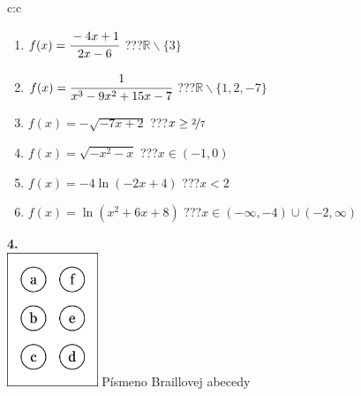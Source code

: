 \documentclass[10pt]{report}
\begin{document}
\begin{tabular}{c:c}
\begin{minipage}[c][104.5mm][t]{0.5\linewidth}
\begin{center}
\begin{minipage}{0.79\linewidth}
\begin{center}
\begin{varwidth}{\linewidth}
\begin{enumerate}
\item $f(x)=\cfrac{-4x+1}{2x-6}$\quad \dotfill\; ???\;\dotfill \quad $\mathbb{R}\smallsetminus\{3\}$
\item $f(x)=\cfrac{1}{x^3-9x^2+15x-7}$\quad \dotfill\; ???\;\dotfill \quad $\mathbb{R}\smallsetminus\{1,2,-7\}$
\item $f(x)=-\sqrt{-7x+2}$\quad \dotfill\; ???\;\dotfill \quad $x\geq\nicefrac{2}{7}$
\item $f(x)=\sqrt{-x^2-x}$\quad \dotfill\; ???\;\dotfill \quad $x\in(-1 , 0)$
\item $f(x)=-4\ln{(-2x+4)}$\quad \dotfill\; ???\;\dotfill \quad $x<2$
\item $f(x)=\ln{(x^2+6x+8)}$\quad \dotfill\; ???\;\dotfill \quad $x\in(-\infty , -4)\cup(-2 , \infty)$
\end{enumerate}
\end{varwidth}
\end{center}
\end{minipage}
\begin{minipage}{0.20\linewidth}
\begin{center}
{\Huge\bfseries 4.} \\[2mm]
\includegraphics[height=40mm]{../images/braille.png}
{\small Písmeno Braillovej abecedy}
\end{center}
\end{minipage}
\end{center}
\end{minipage}
%
\end{tabular}
\newpage
\thispagestyle{empty}
\end{document}
